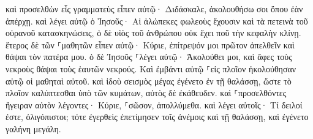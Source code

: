 \documentclass{openreader}
\begin{document}
καὶ προσελθὼν εἷς γραμματεὺς εἶπεν αὐτῷ· Διδάσκαλε, ἀκολουθήσω σοι ὅπου ἐὰν ἀπέρχῃ. 
καὶ λέγει αὐτῷ ὁ Ἰησοῦς· Αἱ ἀλώπεκες φωλεοὺς ἔχουσιν καὶ τὰ πετεινὰ τοῦ οὐρανοῦ κατασκηνώσεις, ὁ δὲ υἱὸς τοῦ ἀνθρώπου οὐκ ἔχει ποῦ τὴν κεφαλὴν κλίνῃ. 
ἕτερος δὲ τῶν ⸀μαθητῶν εἶπεν αὐτῷ· Κύριε, ἐπίτρεψόν μοι πρῶτον ἀπελθεῖν καὶ θάψαι τὸν πατέρα μου. 
ὁ δὲ Ἰησοῦς ⸀λέγει αὐτῷ· Ἀκολούθει μοι, καὶ ἄφες τοὺς νεκροὺς θάψαι τοὺς ἑαυτῶν νεκρούς. 
Καὶ ἐμβάντι αὐτῷ ⸀εἰς πλοῖον ἠκολούθησαν αὐτῷ οἱ μαθηταὶ αὐτοῦ. 
καὶ ἰδοὺ σεισμὸς μέγας ἐγένετο ἐν τῇ θαλάσσῃ, ὥστε τὸ πλοῖον καλύπτεσθαι ὑπὸ τῶν κυμάτων, αὐτὸς δὲ ἐκάθευδεν. 
καὶ ⸀προσελθόντες ἤγειραν αὐτὸν λέγοντες· Κύριε, ⸀σῶσον, ἀπολλύμεθα. 
καὶ λέγει αὐτοῖς· Τί δειλοί ἐστε, ὀλιγόπιστοι; τότε ἐγερθεὶς ἐπετίμησεν τοῖς ἀνέμοις καὶ τῇ θαλάσσῃ, καὶ ἐγένετο γαλήνη μεγάλη. 
\end{document}
